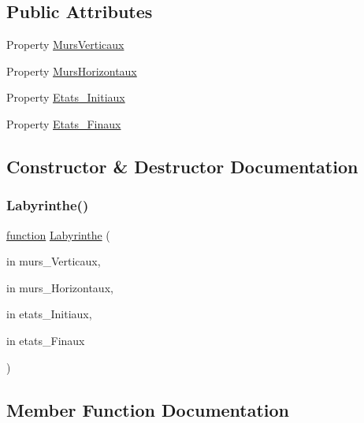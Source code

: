 \subsection*{Public Attributes}
\begin{DoxyCompactItemize}
\item 
Property \hyperlink{class_labyrinthe_a66ec56695d6cfd3c4594e2c6c51ee614}{Murs\+Verticaux}
\item 
Property \hyperlink{class_labyrinthe_acb60d22dd0a228d05ce71d91ef76a3ac}{Murs\+Horizontaux}
\item 
Property \hyperlink{class_labyrinthe_a064dc23b7761f6f77a664dca0dd3570d}{Etats\+\_\+\+Initiaux}
\item 
Property \hyperlink{class_labyrinthe_a277e48199e98efcc0a61d43ad52de86d}{Etats\+\_\+\+Finaux}
\end{DoxyCompactItemize}


\subsection{Constructor \& Destructor Documentation}
\mbox{\label{class_labyrinthe_a6fffd8c87c9756d8d7b18294daa29ca5}} 
\subsubsection{\texorpdfstring{Labyrinthe()}{Labyrinthe()}}
{\footnotesize\ttfamily \hyperlink{_plan__desuma_functions_8m_ac2ffb26d6f42d3bbcd7847b0873403f4}{function} \hyperlink{class_labyrinthe}{Labyrinthe} (\begin{DoxyParamCaption}\item[{in}]{murs\+\_\+\+Verticaux,  }\item[{in}]{murs\+\_\+\+Horizontaux,  }\item[{in}]{etats\+\_\+\+Initiaux,  }\item[{in}]{etats\+\_\+\+Finaux }\end{DoxyParamCaption})}



\subsection{Member Function Documentation}
\mbox{\label{class_labyrinthe_a961e73a265b479f0e68fdf4600ff9cd7}} 
